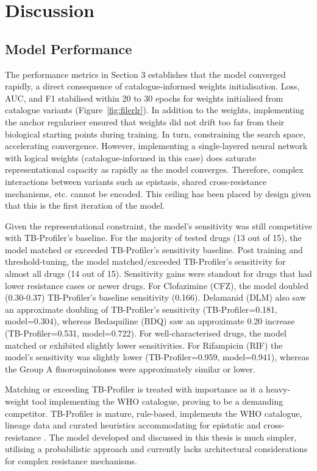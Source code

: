 
\graphicspath{{Figures/Discussion}}

\chapter{Discussion}\label{ch:discc}

\section{Model Performance}
The performance metrics in Section 3 establishes that the model converged rapidly, a direct consequence of catalogue-informed weights initialisation. Loss, AUC, and F1 stabilised within 20 to 30 epochs for weights initialised from catalogue variants (Figure~\ref{fig:filerlr}). In addition to the weights, implementing the anchor regulariser ensured that weights did not drift too far from their biological starting points during training. In turn, constraining the search space, accelerating convergence. However, implementing a single-layered neural network with logical weights (catalogue-informed in this case) does saturate representational capacity as rapidly as the model converges. Therefore, complex interactions between variants such as epistasis, shared cross-resistance mechanisms, etc. cannot be encoded. This ceiling has been placed by design given that this is the first iteration of the model. 

Given the representational constraint, the model's sensitivity was still competitive with TB-Profiler's baseline. For the majority of tested drugs (13 out of 15), the model matched or exceeded TB-Profiler's sensitivity baseline. Post training and threshold-tuning, the model matched/exceeded TB-Profiler's sensitivity for almost all drugs (14 out of 15). Sensitivity gains were standout for drugs that had lower resistance cases or newer drugs. For Clofazimine (CFZ), the model doubled (0.30-0.37) TB-Profiler's baseline sensitivity (0.166). Delamanid (DLM) also saw an approximate doubling of TB-Profiler's sensitivity (TB-Profiler=0.181, model=0.304), whereas Bedaquiline (BDQ) saw an approximate 0.20 increase (TB-Profiler=0.531, model=0.722). For well-characterised drugs, the model matched or exhibited slightly lower sensitivities. For Rifampicin (RIF) the model's sensitivity was slightly lower (TB-Profiler=0.959, model=0.941), whereas the Group A fluoroquinolones were approximately similar or lower. 

Matching or exceeding TB-Profiler is treated with importance as it a heavy-weight tool implementing the WHO catalogue, proving to be a demanding competitor. TB-Profiler is mature, rule-based, implements the WHO catalogue, lineage data and curated heuristics accommodating for epistatic and cross-resistance \cite{phelan2019integrating}. The model developed and discussed in this thesis is much simpler, utilising a probabilistic approach and currently lacks architectural considerations for complex resistance mechanisms. 

